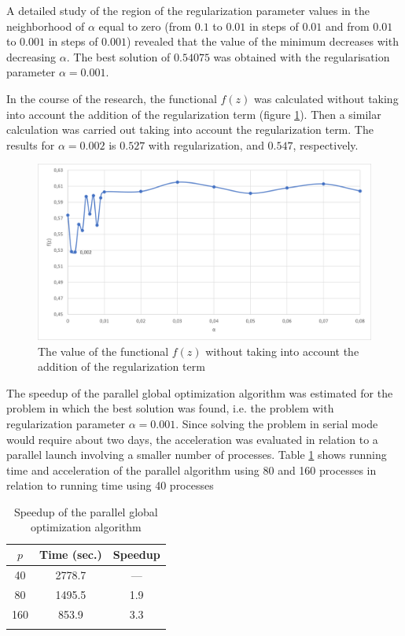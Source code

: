 \documentclass{svproc}
\begin{document}
A detailed study of the region of the regularization parameter values in the neighborhood of $\alpha$ equal to zero (from $0.1$ to $0.01$ in steps of $0.01$ and from $0.01$ to $0.001$ in steps of $0.001$) revealed that the value of the minimum decreases with decreasing $\alpha$. The best solution of $0.54075$ was obtained with the regularisation parameter $\alpha = 0.001$.

In the course of the research, the functional $f(z)$ was calculated without taking into account the addition of the regularization term (figure \ref{fig7}). Then a similar calculation was carried out taking into account the regularization term. The results for $\alpha=0.002$ is $0.527$ with regularization, and $0.547$, respectively.

\begin{figure}
\centering
\includegraphics[height=6.0 cm]{fig7.png}
\caption{The value of the functional $f(z)$ without taking into account the addition of the regularization term}
\label{fig7}
\end{figure}

The speedup of the parallel global optimization algorithm was estimated for the problem in which the best solution was found, i.e. the problem with regularization parameter $\alpha = 0.001$.
Since solving the problem in serial mode would require about two days, the acceleration was evaluated in relation to a parallel launch involving a smaller number of processes.
Table \ref{table_2} shows running time and acceleration of the parallel algorithm using 80 and 160 processes in relation to running time using 40 processes

\begin{table}
\caption{Speedup of the parallel  global optimization algorithm}
\label{table_2}
\begin{center}
\begin{tabular}{ccc}
\hline\noalign{\smallskip}
 $p$     & Time (sec.)  & Speedup \\
\hline\noalign{\smallskip}
40	&	2778.7		&	---	\\
80	&	1495.5		&	1.9	\\
160	&	853.9	    &	3.3	\\
\noalign{\smallskip}\hline
\end{tabular}\end{center}\end{table}
\end{document}
